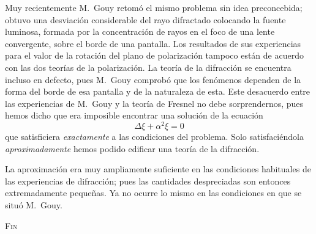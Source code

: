 Muy recientemente M.~Gouy retomó el mismo problema sin idea
preconcebida; obtuvo una desviación considerable del rayo difractado
colocando la fuente luminosa, formada por la concentración de rayos en el
foco de una lente convergente, sobre el borde de una pantalla. Los
resultados de sus experiencias para el valor de la rotación del plano de
polarización tampoco están de acuerdo con las dos teorías de la
polarización. La teoría de la difracción se encuentra incluso en defecto,
pues M.~Gouy comprobó que los fenómenos dependen de la forma del
borde de esa pantalla y de la naturaleza de esta. Este desacuerdo entre las
experiencias de M.~Gouy y la teoría de Fresnel no debe sorprendernos,
pues hemos dicho que era imposible encontrar una solución de la ecuación
\[
\Delta\xi + \alpha^2\xi = 0
\]
que satisficiera \emph{exactamente} a las condiciones del problema. Solo
satisfaciéndola \emph{aproximadamente} hemos podido edificar una teoría de
la difracción.

La aproximación era muy ampliamente suficiente en las condiciones
habituales de las experiencias de difracción; pues las cantidades
despreciadas son entonces extremadamente pequeñas. Ya no ocurre lo mismo en
las condiciones en que se situó M.~Gouy.

\bigskip
\begin{center}
\textsc{Fin}
\end{center}
